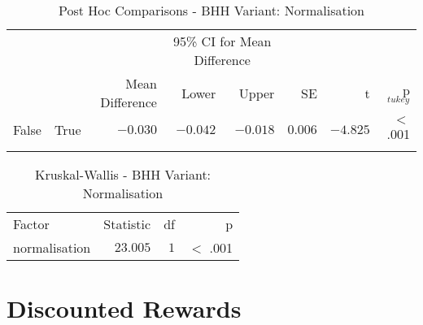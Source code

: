 \begin{table}[H]
	\centering
	\caption{Post Hoc Comparisons - BHH Variant: Normalisation}
	\label{tab:results:normalise:post_hoc}%
	\par\bigskip
	\resizebox{\textwidth}{!}
	{
		\begin{tabular}{lrrrrrrr}
			\toprule
			\multicolumn{1}{c}{} & \multicolumn{1}{c}{} & \multicolumn{1}{c}{} & \multicolumn{2}{c}{95\% CI for Mean Difference} & \multicolumn{1}{c}{} & \multicolumn{1}{c}{} & \multicolumn{1}{c}{}               \\
			\cline{4-5}
			$ $                  & $ $                  & Mean Difference      & Lower                                           & Upper                & SE                   & t                    & p$_{tukey}$ \\
			\cmidrule[0.4pt]{1-8}
			False                & True                 & $-0.030$             & $-0.042$                                        & $-0.018$             & $0.006$              & $-4.825$             & $<$ .001    \\
			\bottomrule
			\addlinespace[1ex]
		\end{tabular}
	}
\end{table}


\begin{table}[H]
	\centering
	\caption{Kruskal-Wallis - BHH Variant: Normalisation}
	\label{tab:results:normalise:kruskal}%
	\par\bigskip
	\resizebox{0.5\textwidth}{!}
	{
		\begin{tabular}{lrrr}
			\toprule
			Factor        & Statistic & df  & p        \\
			\cmidrule[0.4pt]{1-4}
			normalisation & $23.005$  & $1$ & $<$ .001 \\
			\bottomrule
		\end{tabular}
	}
\end{table}

\newpage
\section{Discounted Rewards}\label{app:statistical_analysis:bhh_variant_discounted_rewards}

